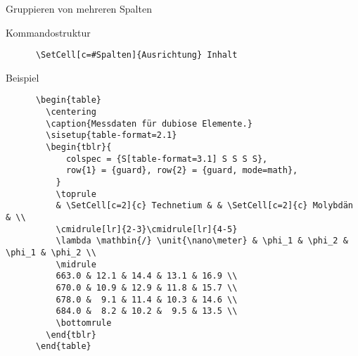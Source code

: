 \begin{frame}[fragile]{Gruppieren von mehreren Spalten}
  \begin{block}{Kommandostruktur}
    \begin{verbatim}
      \SetCell[c=#Spalten]{Ausrichtung} Inhalt
    \end{verbatim}
  \end{block}
  \fontsize{8}{6}
  \begin{block}{Beispiel}
    \begin{verbatim}
      \begin{table}
        \centering
        \caption{Messdaten für dubiose Elemente.}
        \sisetup{table-format=2.1}
        \begin{tblr}{
            colspec = {S[table-format=3.1] S S S S},
            row{1} = {guard}, row{2} = {guard, mode=math},
          }
          \toprule
          & \SetCell[c=2]{c} Technetium & & \SetCell[c=2]{c} Molybdän & \\
          \cmidrule[lr]{2-3}\cmidrule[lr]{4-5}
          \lambda \mathbin{/} \unit{\nano\meter} & \phi_1 & \phi_2 & \phi_1 & \phi_2 \\
          \midrule
          663.0 & 12.1 & 14.4 & 13.1 & 16.9 \\
          670.0 & 10.9 & 12.9 & 11.8 & 15.7 \\
          678.0 &  9.1 & 11.4 & 10.3 & 14.6 \\
          684.0 &  8.2 & 10.2 &  9.5 & 13.5 \\
          \bottomrule
        \end{tblr}
      \end{table}
    \end{verbatim}
  \end{block}
\end{frame}


